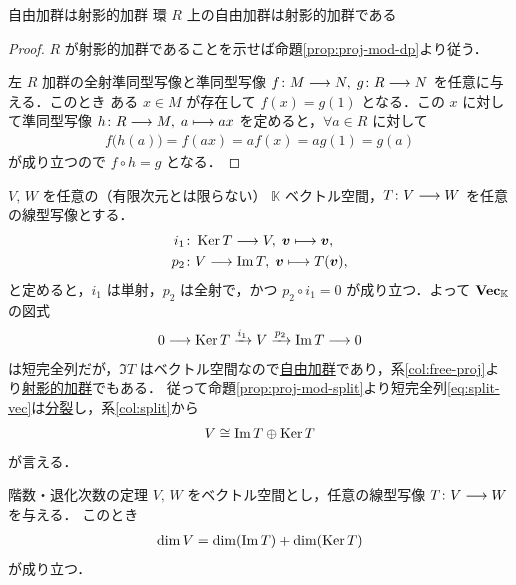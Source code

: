\documentclass[rep_main]{subfiles}
\begin{document}
\begin{mycol}[label=col:free-proj]{自由加群は射影的加群}
    環 $R$ 上の自由加群は射影的加群である
\end{mycol}

\begin{proof}
    $R$ が射影的加群であることを示せば命題\ref{prop:proj-mod-dp}より従う．

    左 $R$ 加群の全射準同型写像と準同型写像 $f \colon M \longrightarrow N,\; g\colon R \longrightarrow N$ を任意に与える．このとき
    ある $x \in M$ が存在して $f(x) = g(1)$ となる．この $x$ に対して準同型写像 $h \colon R \longrightarrow M,\; a \longmapsto ax$ を定めると，$\forall a \in R$ に対して
    \begin{align}
        f \bigl( h(a) \bigr)  = f(ax) = af(x) = ag(1) = g(a)
    \end{align}
    が成り立つので $f \circ h = g$ となる．
\end{proof}

$V,\, W$ を任意の（有限次元とは限らない） $\mathbb{K}$ ベクトル空間，$T \colon V \longrightarrow W$ を任意の線型写像とする．
\begin{align}
	i_1 &\colon \operatorname{Ker} T  \longrightarrow V,\; \bm{v} \longmapsto \bm{v}, \\
	p_2 &\colon V \longrightarrow \Im T,\; \bm{v} \longmapsto T(\bm{v}),
\end{align}
と定めると，$i_1$ は単射，$p_2$ は全射で，かつ $p_2 \circ i_1 = 0$ が成り立つ．よって $\bm{\mathrm{Vec}_{\mathbb{K}}}$ の図式
\begin{align}
	\label{eq:split-vec}
	0 \longrightarrow \operatorname{Ker} T \xrightarrow{i_1} V \xrightarrow{p_2} \Im T \longrightarrow 0
\end{align}
は短完全列だが，$\Im T$ はベクトル空間なので\hyperref[def:free-mod]{自由加群}であり，系\ref{col:free-proj}より\hyperref[def:proj-mod]{射影的加群}でもある．
従って命題\ref{prop:proj-mod-split}より短完全列\eqref{eq:split-vec}は\hyperref[def:split]{分裂}し，系\ref{col:split}から
\begin{align}
	V \cong \Im T \oplus \operatorname{Ker} T
\end{align}
が言える．

\begin{mytheo}[label=thm:rank-nullity]{階数・退化次数の定理}
	$V,\, W$ をベクトル空間とし，任意の線型写像 $T \colon V \longrightarrow W$ を与える．
	このとき
	\begin{align}
		\dim V = \dim (\Im T) + \dim (\operatorname{Ker} T)
	\end{align}
	が成り立つ．
\end{mytheo}


\end{document}
